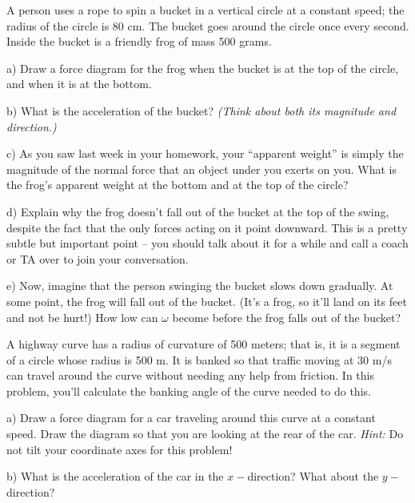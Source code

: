 \documentclass[12pt]{article}
\begin{document}
\Large
\centerline{}
\normalsize
\centerline{}


A person uses a rope to spin a bucket in a vertical circle at a constant speed; the radius of the circle is 80 cm. The bucket goes around the circle once every second. Inside the bucket is a friendly frog of mass 500 grams. 

\begin{minipage}{0.5\textwidth}
a) Draw a force diagram for the frog when the bucket is at the top of the circle, and when it is at the bottom.
\end{minipage}
\hspace{0.1\textwidth}
\begin{minipage}{0.4\textwidth}
b) What is the acceleration of the bucket? {\it (Think about both its magnitude and direction.)}
\end{minipage}
\vspace{3in}


c) As you saw last week in your homework, your ``apparent weight'' is simply the magnitude of the normal force that an object under you exerts on you. What is the frog's apparent weight at the bottom and at the top of the circle?

\vspace{2in}
\newpage
d) Explain why the frog doesn't fall out of the bucket at the top of the swing, despite the fact that the only forces acting on it point downward. This is a pretty subtle but important point -- you should talk about it for a while and call a coach or TA over to join your conversation.

\vspace{2in}

e) Now, imagine that the person swinging the bucket slows down gradually. At some point, the frog will fall out of the bucket. (It's a frog, so it'll land on its feet and not be hurt!) How low can $\omega$ become before the frog falls out of the bucket?

\newpage


A highway curve has a radius of curvature of 500 meters; that is, it is a segment of a circle whose radius is 500 m. It is banked so that traffic moving at 30 m/s can travel
around the curve without needing any help from friction. In this problem, you'll calculate the banking angle of the curve needed to do this.

\bigskip



\begin{minipage}{0.5\textwidth}
a) Draw a force diagram for a car traveling around this curve at a constant speed. Draw the diagram so that you are looking at the rear of the car. {\it Hint:} Do not tilt your coordinate axes for this problem!
\end{minipage}
\hspace{0.1\textwidth}
\begin{minipage}{0.4\textwidth}
b) What is the acceleration of the car in the $x-$direction? What about the $y-$direction?
\end{minipage}
\vspace{2.5in}
\end{document}
